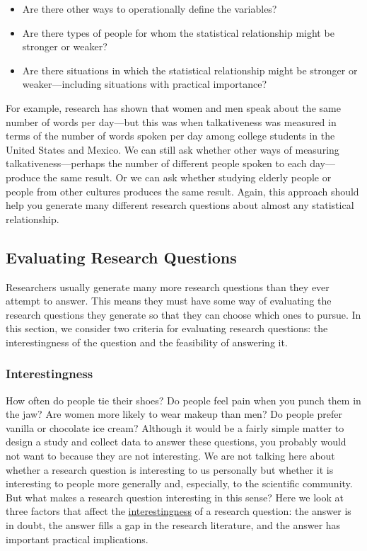 \documentclass[
]{krantz}
\providecommand{\tightlist}{%
  \setlength{\itemsep}{0pt}\setlength{\parskip}{0pt}}
\begin{document}
\begin{itemize}
\tightlist
\item
  Are there other ways to operationally define the variables?
\item
  Are there types of people for whom the statistical relationship might be stronger or weaker?
\item
  Are there situations in which the statistical relationship might be stronger or weaker---including situations with practical importance?
\end{itemize}

For example, research has shown that women and men speak about the same number of words per day---but this was when talkativeness was measured in terms of the number of words spoken per day among college students in the United States and Mexico. We can still ask whether other ways of measuring talkativeness---perhaps the number of different people spoken to each day---produce the same result. Or we can ask whether studying elderly people or people from other cultures produces the same result. Again, this approach should help you generate many different research questions about almost any statistical relationship.

\hypertarget{evaluating-research-questions}{%
\subsection*{Evaluating Research Questions}\label{evaluating-research-questions}}


Researchers usually generate many more research questions than they ever attempt to answer. This means they must have some way of evaluating the research questions they generate so that they can choose which ones to pursue. In this section, we consider two criteria for evaluating research questions: the interestingness of the question and the feasibility of answering it.

\hypertarget{interestingness}{%
\subsubsection*{Interestingness}\label{interestingness}}


How often do people tie their shoes? Do people feel pain when you punch them in the jaw? Are women more likely to wear makeup than men? Do people prefer vanilla or chocolate ice cream? Although it would be a fairly simple matter to design a study and collect data to answer these questions, you probably would not want to because they are not interesting. We are not talking here about whether a research question is interesting to us personally but whether it is interesting to people more generally and, especially, to the scientific community. But what makes a research question interesting in this sense? Here we look at three factors that affect the \protect\hyperlink{interestingness-1}{interestingness} of a research question: the answer is in doubt, the answer fills a gap in the research literature, and the answer has important practical implications.
\end{document}

